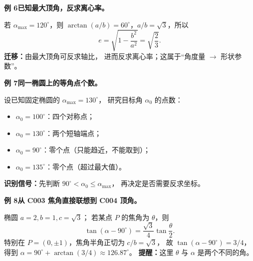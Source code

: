 \begin{examplebox}
\medskip
\textbf{例 6\quad 已知最大顶角，反求离心率。}

若 $\alpha_{\max}=120^\circ$，则
$\arctan(a/b)=60^\circ$，$a/b=\sqrt3$，所以
\[
\boxed{e=\sqrt{1-\frac{b^2}{a^2}}
=\sqrt{\frac23}}.
\]
\textbf{迁移：}由最大顶角可反求轴比，
进而反求离心率；这属于“角度量 $\to$ 形状参数”。

\medskip
\textbf{例 7\quad 同一椭圆上的等角点个数。}

设已知固定椭圆的 $\alpha_{\max}=130^\circ$，
研究目标角 $\alpha_0$ 的点数：
\begin{itemize}
\item $\alpha_0=100^\circ$：四个对称点；
\item $\alpha_0=130^\circ$：两个短轴端点；
\item $\alpha_0=90^\circ$：零个点（只能趋近，不能取到）；
\item $\alpha_0=135^\circ$：零个点（超过最大值）。
\end{itemize}
\textbf{识别信号：}先判断 $90^\circ<\alpha_0\le\alpha_{\max}$，
再决定是否需要反求坐标。

\medskip
\textbf{例 8\quad 从 C003 焦角直接联想到 C004 顶角。}

椭圆 $a=2,b=1,c=\sqrt3$；
若某点 $P$ 的焦角为 $\theta$，则
\[
\tan(\alpha-90^\circ)
=\frac{\sqrt3}{4}\tan\frac\theta2.
\]
特别在 $P=(0,\pm1)$，焦角半角正切为 $c/b=\sqrt3$，
故 $\tan(\alpha-90^\circ)=3/4$，得到
$\alpha=90^\circ+\arctan(3/4)\approx126.87^\circ$。
\textbf{提醒：}这里 $\theta$ 与 $\alpha$ 是两个不同的角。
\end{examplebox}
